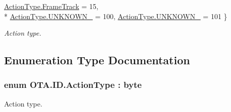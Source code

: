 \begin{DoxyCompactItemize}
\hyperlink{namespace_o_t_a_1_1_i_d_a57decdbefe599cd02efcf8605eccec21ac55fb5bc02692cb77b1b4b144480e251}{Action\+Type.\+Frame\+Track} = 15, 
\\*
\hyperlink{namespace_o_t_a_1_1_i_d_a57decdbefe599cd02efcf8605eccec21a36bc3a08d1039521174dc924c02a3999}{Action\+Type.\+U\+N\+K\+N\+O\+W\+N\+\_} = 100, 
\hyperlink{namespace_o_t_a_1_1_i_d_a57decdbefe599cd02efcf8605eccec21a6348f945cf9021cafc37dfe5af2296d8}{Action\+Type.\+U\+N\+K\+N\+O\+W\+N\+\_} = 101
 \}\begin{DoxyCompactList}\small\item\em Action type. \end{DoxyCompactList}
\end{DoxyCompactItemize}


\subsection{Enumeration Type Documentation}
\hypertarget{namespace_o_t_a_1_1_i_d_a57decdbefe599cd02efcf8605eccec21}{}
\subsubsection[{Action\+Type}]{\setlength{\rightskip}{0pt plus 5cm}enum {\bf O\+T\+A.\+I\+D.\+Action\+Type} \+: byte\hspace{0.3cm}{\ttfamily [strong]}}\label{namespace_o_t_a_1_1_i_d_a57decdbefe599cd02efcf8605eccec21}


Action type. 

